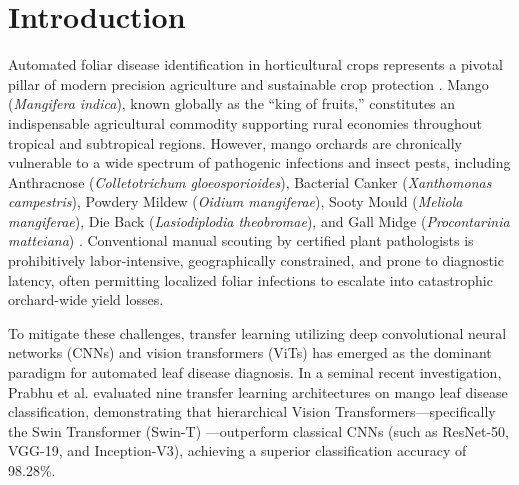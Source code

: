 \documentclass[journal,10pt,twocolumn]{article}
\begin{document}
\section{Introduction}
\label{sec:introduction}

Automated foliar disease identification in horticultural crops represents a pivotal pillar of modern precision agriculture and sustainable crop protection \cite{prabhu2025investigation, saleem2019plant}. Mango (\textit{Mangifera indica}), known globally as the ``king of fruits,'' constitutes an indispensable agricultural commodity supporting rural economies throughout tropical and subtropical regions. However, mango orchards are chronically vulnerable to a wide spectrum of pathogenic infections and insect pests, including Anthracnose (\textit{Colletotrichum gloeosporioides}), Bacterial Canker (\textit{Xanthomonas campestris}), Powdery Mildew (\textit{Oidium mangiferae}), Sooty Mould (\textit{Meliola mangiferae}), Die Back (\textit{Lasiodiplodia theobromae}), and Gall Midge (\textit{Procontarinia matteiana}) \cite{rahman2024mango, prabhu2025investigation}. Conventional manual scouting by certified plant pathologists is prohibitively labor-intensive, geographically constrained, and prone to diagnostic latency, often permitting localized foliar infections to escalate into catastrophic orchard-wide yield losses.

To mitigate these challenges, transfer learning utilizing deep convolutional neural networks (CNNs) and vision transformers (ViTs) has emerged as the dominant paradigm for automated leaf disease diagnosis. In a seminal recent investigation, Prabhu et al. \cite{prabhu2025investigation} evaluated nine transfer learning architectures on mango leaf disease classification, demonstrating that hierarchical Vision Transformers---specifically the Swin Transformer (Swin-T) \cite{liu2021swin}---outperform classical CNNs (such as ResNet-50, VGG-19, and Inception-V3), achieving a superior classification accuracy of 98.28\%. 
\end{document}
